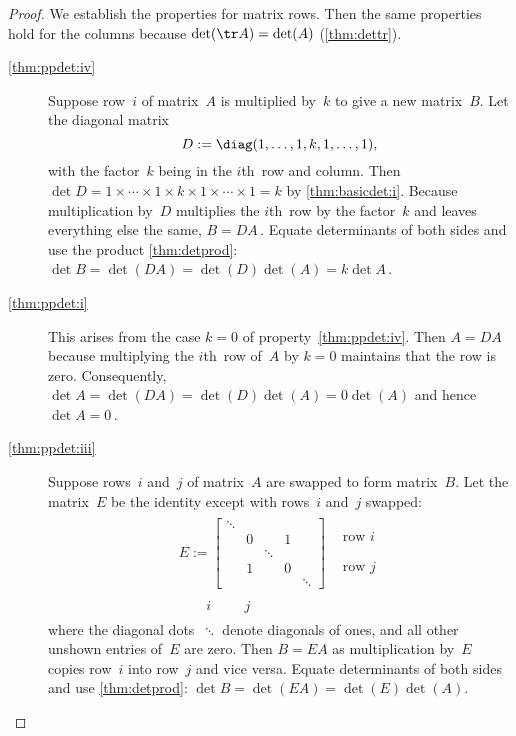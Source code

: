 \begin{proof} 
We establish the  properties for matrix rows.  
Then the same properties hold for the columns because \(\det(\tr A)=\det(A)\) (\cref{thm:dettr}).
\begin{description}
\item[\ref{thm:ppdet:iv}]
Suppose row~\(i\) of matrix~\(A\) is multiplied by~\(k\) to give a new matrix~\(B\).
Let the diagonal matrix
\begin{equation*}
D:=\diag(1,\ldots,1,k,1,\ldots,1),
\end{equation*}
with the factor~\(k\) being in the \(i\)th~row and column.
Then \(\det D=1\times\cdots\times1\times k\times1\times\cdots\times1=k\)  by \cref{thm:basicdet:i}.
Because multiplication by~\(D\) multiplies the \(i\)th~row by the factor~\(k\) and leaves everything else the same,  \(B=DA\)\,.
Equate determinants of both sides and use the product \cref{thm:detprod}: \(\det B=\det(DA)=\det(D)\det(A)=k\det A\)\,.


\item[\ref{thm:ppdet:i}]
This arises from the case \(k=0\) of property~\ref{thm:ppdet:iv}.
Then \(A=DA\) because multiplying the \(i\)th~row of~\(A\) by \(k=0\) maintains that the row is zero.
Consequently, \(\det A=\det(DA)=\det(D)\det(A)=0\det(A)\) and hence \(\det A=0\)\,.

\item[\ref{thm:ppdet:iii}]
Suppose rows~\(i\) and~\(j\) of matrix~\(A\) are swapped to form matrix~\(B\).
Let the matrix~\(E\) be the identity except with rows~\(i\) and~\(j\) swapped:
\begin{equation*}
\begin{array}{rl}
E:=\begin{bmatrix} 
\ddots
\\&0&&1
\\&&\ddots
\\&1&&0
\\&&&&\ddots \end{bmatrix}&
\begin{matrix} \phantom{\vdots}
\\\text{row }i \\\phantom{\vdots}
\\\text{row }j \\\phantom{\vdots} \end{matrix}
\\
\begin{matrix}\phantom{\cdots}&i&\phantom{\cdots}&j&\phantom{\cdots}  \end{matrix}\quad&
\end{array}
\end{equation*}
where the diagonal dots~\(\ddots\) denote diagonals of ones, and all other unshown entries of~\(E\) are zero.
Then \(B=EA\) as multiplication by~\(E\) copies row~\(i\) into row~\(j\) and vice versa.
Equate determinants of both sides and use \cref{thm:detprod}: \(\det B=\det(EA)=\det(E)\det(A)\).


\end{description}
\end{proof}
